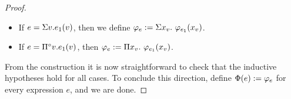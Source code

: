 \begin{proof}
\begin{itemize}
	\item If $e=\Sigma v. e_1(v)$, then we define $\varphi_e := \Sigma x_{v}. \  \varphi_{e_1}(x_v)$.

  \item If $e=\Pi^{\circ} v. e_1(v)$, then $\varphi_e := \Pi x_{v}.\  \varphi_{e_1}(x_v)$.
\end{itemize}
From the construction it is now straightforward to check that the inductive hypotheses hold for all cases. To conclude this direction, define $\Phi(e) := \varphi_e$ for every expression $e$, and we are done.

\medskip

\newcommand{\evarphi}{e_\varphi}


\end{proof}
